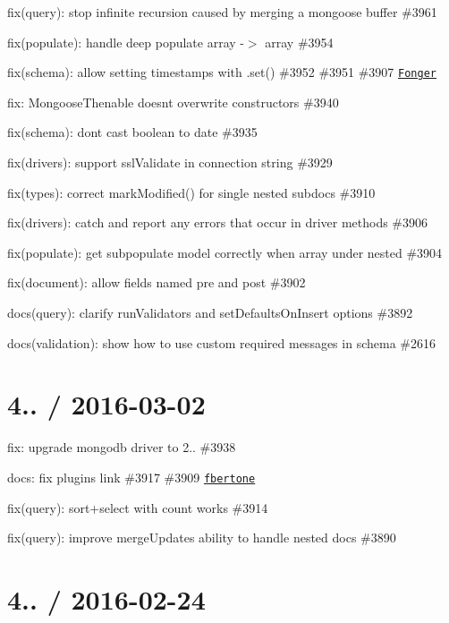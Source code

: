 \begin{DoxyItemize}
\item fix(query)\+: stop infinite recursion caused by merging a mongoose buffer \#3961
\item fix(populate)\+: handle deep populate array -\/$>$ array \#3954
\item fix(schema)\+: allow setting timestamps with .set() \#3952 \#3951 \#3907 \href{https://github.com/Fonger}{\tt Fonger}
\item fix\+: Mongoose\+Thenable doesn\textquotesingle{}t overwrite constructors \#3940
\item fix(schema)\+: don\textquotesingle{}t cast boolean to date \#3935
\item fix(drivers)\+: support ssl\+Validate in connection string \#3929
\item fix(types)\+: correct mark\+Modified() for single nested subdocs \#3910
\item fix(drivers)\+: catch and report any errors that occur in driver methods \#3906
\item fix(populate)\+: get subpopulate model correctly when array under nested \#3904
\item fix(document)\+: allow fields named \textquotesingle{}pre\textquotesingle{} and \textquotesingle{}post\textquotesingle{} \#3902
\item docs(query)\+: clarify run\+Validators and set\+Defaults\+On\+Insert options \#3892
\item docs(validation)\+: show how to use custom required messages in schema \#2616
\end{DoxyItemize}

\section*{4.. / 2016-\/03-\/02 }


\begin{DoxyItemize}
\item fix\+: upgrade mongodb driver to 2.. \#3938
\item docs\+: fix plugins link \#3917 \#3909 \href{https://github.com/fbertone}{\tt fbertone}
\item fix(query)\+: sort+select with count works \#3914
\item fix(query)\+: improve merge\+Update\textquotesingle{}s ability to handle nested docs \#3890
\end{DoxyItemize}

\section*{4.. / 2016-\/02-\/24 }


